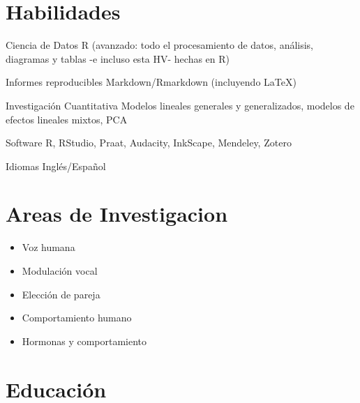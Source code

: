 \documentclass[11pt, a4paper]{awesome-cv}
\providecommand{\tightlist}{%
	\setlength{\itemsep}{0pt}\setlength{\parskip}{0pt}}
\begin{document}
\hypertarget{habilidades}{%
\section{Habilidades}\label{habilidades}}

\begin{cvskills}
  \cvskill
    {Ciencia de Datos}
    {R (avanzado: todo el procesamiento de datos, análisis, diagramas y tablas -e incluso esta HV- hechas en R)}

  \cvskill
    {Informes reproducibles}
    {Markdown/Rmarkdown (incluyendo {\selectfont\LaTeX})}

  \cvskill
    {Investigación Cuantitativa}
    {Modelos lineales generales y generalizados, modelos de efectos lineales mixtos, PCA}

  \cvskill
    {Software}
    {R, RStudio, Praat, Audacity, InkScape, Mendeley, Zotero}

  \cvskill
    {Idiomas}
    {Inglés/Español}
\end{cvskills}

\hypertarget{areas-de-investigacion}{%
\section{Areas de Investigacion}\label{areas-de-investigacion}}

\begin{itemize}
\tightlist
\item
  Voz humana
\item
  Modulación vocal
\item
  Elección de pareja
\item
  Comportamiento humano
\item
  Hormonas y comportamiento
\end{itemize}

\hypertarget{educaciuxf3n}{%
\section{Educación}\label{educaciuxf3n}}
\end{document}
